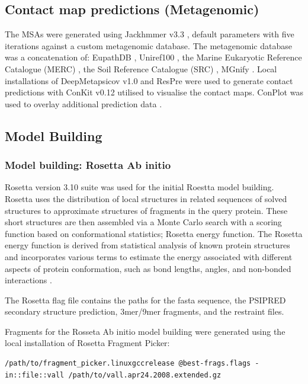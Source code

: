 \subsection{Contact map predictions (Metagenomic)}
The MSAs were generated using Jackhmmer v3.3 \cite{Johnson2010}, default parameters with five iterations against a custom metagenomic database. The metagenomic database was a concatenation of: EupathDB \cite{Aurrecoechea2017}, Uniref100 \cite{Apweiler2004}, the Marine Eukaryotic Reference Catalogue (MERC) \cite{Steinegger2018}, the Soil Reference Catalogue (SRC) \cite{Steinegger2018}, MGnify \cite{Mitchell2019}. Local installations of DeepMetapsicov v1.0  \cite{Kandathil2019} and ResPre \cite{Li} were used to generate contact predictions with ConKit v0.12 \cite{conkit2017} utilised to visualise the contact maps. ConPlot was used to overlay additional prediction data \cite{sanchez2021conplot}.

\subsection{Model Building}
\subsubsection{Model building: Rosetta Ab initio}
Rosetta version 3.10 suite \cite{raman2009structure} was used for the initial Roestta model building. Rosetta uses the distribution of local structures in related sequences of solved structures to approximate structures of fragments in the query protein. These short structures are then assembled via a Monte Carlo search with a scoring function based on conformational statistics; Rosetta energy function.  The Rosetta energy function is derived from statistical analysis of known protein structures and incorporates various terms to estimate the energy associated with different aspects of protein conformation, such as bond lengths, angles, and non-bonded interactions \cite{baker2001protein}. 

The Rosetta flag file contains the paths for the fasta sequence, the PSIPRED \cite{McGuffin2000} secondary structure prediction, 3mer/9mer fragments, and the restraint files.

Fragments for the Rosseta Ab initio model building were generated using the local installation of Rosetta Fragment Picker:

\begin{lstlisting}[style=linux-terminal]
/path/to/fragment_picker.linuxgccrelease @best-frags.flags -in::file::vall /path/to/vall.apr24.2008.extended.gz
\end{lstlisting}

